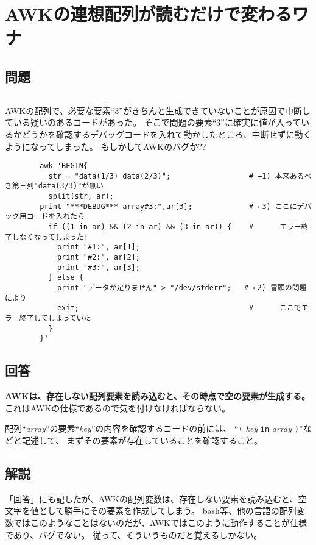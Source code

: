 \section{AWKの連想配列が読むだけで変わるワナ}

\subsection*{問題}
\noindent
$\!\!\!\!\!$
\begin{grshfboxit}{160.0mm}
	AWKの配列で、必要な要素``3''がきちんと生成できていないことが原因で中断している疑いのあるコードがあった。
	そこで問題の要素``3''に確実に値が入っているかどうかを確認するデバッグコードを入れて動かしたところ、中断せずに動くようになってしまった。
	もしかしてAWKのバグか??
	\begin{verbatim}
		awk 'BEGIN{
		  str = "data(1/3) data(2/3)";                  # ←1) 本来あるべき第三列"data(3/3)"が無い
		  split(str, ar);
		print "***DEBUG*** array#3:",ar[3];             # ←3) ここにデバッグ用コードを入れたら
		  if ((1 in ar) && (2 in ar) && (3 in ar)) {    #      エラー終了しなくなってしまった!
		    print "#1:", ar[1];
		    print "#2:", ar[2];
		    print "#3:", ar[3];
		  } else {
		    print "データが足りません" > "/dev/stderr";   # ←2) 冒頭の問題により
		    exit;                                       #      ここでエラー終了してしまっていた
		  }
		}'
	\end{verbatim}
\end{grshfboxit}

\subsection*{回答}
\textbf{AWKは、存在しない配列要素を読み込むと、その時点で空の要素が生成する。}
これはAWKの仕様であるので気を付けなければならない。

配列``\textit{array}''の要素``\textit{key}''の内容を確認するコードの前には、
``\verb|(| \textit{key} \verb|in| \textit{array} \verb|)|''などと記述して、
まずその要素が存在していることを確認すること。

\subsection*{解説}

「回答」にも記したが、AWKの配列変数は、存在しない要素を読み込むと、空文字を値として勝手にその要素を作成してしまう。
bash等、他の言語の配列変数ではこのようなことはないのだが、AWKではこのように動作することが仕様であり、バグでない。
従って、そういうものだと覚えるしかない。

